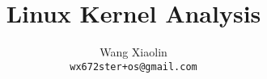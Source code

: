


\AtBeginPart{\frame{\partpage}}

\title{Linux Kernel Analysis}
\author{Wang Xiaolin\\{\small \texttt{wx672ster+os@gmail.com}}}

